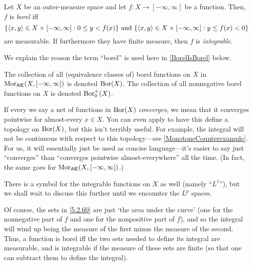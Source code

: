 \begin{dfn}\label{IntegrableFunction}
Let $X$ be an outer-measure space and let $f:X\rightarrow [-\infty ,\infty ]$ be a function.  Then, $f$ is \emph{borel} iff
\begin{equation}\label{5.2.60}
\{ \langle x,y\rangle\in X\times [-\infty ,\infty ]:0\leq y<f(x)\} \text{ and }\{ \langle x,y\rangle\in X\times [-\infty ,\infty ]:y\leq f(x)<0\}
\end{equation}
are measurable.  If furthermore they have finite measure, then $f$ is \emph{integrable}.
\begin{rmk}
We explain the reason the term ``borel'' is used here in \cref{BorelIsBorel} below.
\end{rmk}
\begin{rmk}
The collection of all (equivalence classes of) borel functions on $X$ in $\operatorname{Mor} _{\mathsf{AlE}}(X,[-\infty ,\infty ])$ is denoted $\operatorname{Bor} (X)$.  The collection of all nonnegative borel functions on $X$ is denoted $\operatorname{Bor} _0^+(X)$.
\end{rmk}
\begin{rmk}
If every we say a net of functions in $\operatorname{Bor} (X)$ \emph{converges}, we mean that it converges pointwise for almost-every $x\in X$.  You can even apply  to have this define a topology on $\operatorname{Bor} (X)$, but this isn't terribly useful.  For example, the integral will not be continuous with respect to this topology---see \cref{MonotoneCounterexample}.  For us, it will essentially just be used as concise language---it's easier to say just ``converges'' than ``converges pointwise almost-everywhere'' all the time.  (In fact, the same goes for $\operatorname{Mor} _{\mathsf{AlE}}(X,[-\infty ,\infty ])$.)
\end{rmk}
\begin{rmk}
There is a symbol for the integrable functions on $X$ as well (namely ``$L^1$''), but we shall wait to discuss this further until we encounter the $L^p$ spaces.
\end{rmk}
\begin{rmk}
Of course, the sets in \eqref{5.2.60} are just `the area under the curve' (one for the nonnegative part of $f$ and one for the nonpositive part of $f$), and so the integral will wind up being the measure of the first minus the measure of the second.  Thus, a function is borel iff the two sets needed to define its integral are measurable, and is integrable if the measure of these sets are finite (so that one can subtract them to define the integral).
\end{rmk}
\end{dfn}

